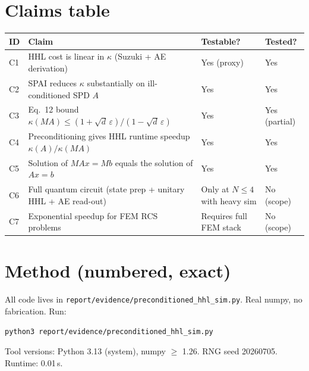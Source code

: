 \documentclass[11pt]{article}
\begin{document}
\section{Claims table}

\begin{tabular}{llll}
\toprule
ID & Claim & Testable? & Tested? \\
\midrule
C1 & HHL cost is linear in $\kappa$ (Suzuki + AE derivation)         & Yes (proxy)   & Yes \\
C2 & SPAI reduces $\kappa$ substantially on ill-conditioned SPD $A$  & Yes           & Yes \\
C3 & Eq.~12 bound $\kappa(MA)\le(1+\sqrt d\,\varepsilon)/(1-\sqrt d\,\varepsilon)$ & Yes & Yes (partial) \\
C4 & Preconditioning gives HHL runtime speedup $\kappa(A)/\kappa(MA)$ & Yes         & Yes \\
C5 & Solution of $MAx=Mb$ equals the solution of $Ax=b$              & Yes           & Yes \\
C6 & Full quantum circuit (state prep + unitary HHL + AE read-out)   & Only at $N\le 4$ with heavy sim & No (scope) \\
C7 & Exponential speedup for FEM RCS problems                        & Requires full FEM stack & No (scope) \\
\bottomrule
\end{tabular}

\section{Method (numbered, exact)}

All code lives in \texttt{report/evidence/preconditioned\_hhl\_sim.py}. Real
numpy, no fabrication. Run:
\begin{lstlisting}
python3 report/evidence/preconditioned_hhl_sim.py
\end{lstlisting}
Tool versions: Python 3.13 (system), numpy $\ge$ 1.26. RNG seed 20260705.
Runtime: 0.01\,s.
\end{document}
